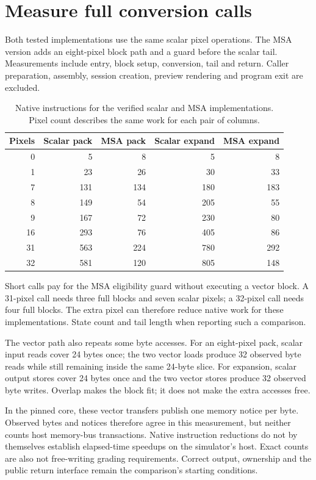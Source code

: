 \section{Measure full conversion calls}\label{rgb-measurement}
Both tested implementations use the same scalar pixel operations. The MSA version
adds an eight-pixel block path and a guard before the scalar tail. Measurements
include entry, block setup, conversion, tail and return. Caller preparation,
assembly, session creation, preview rendering and program exit are excluded.

\begin{table}[htbp]
  \centering
  \caption{Native instructions for the verified scalar and MSA implementations. Pixel count describes the same work for each pair of columns.}
  \begin{tabular}{rrrrr}
    \toprule
    Pixels & Scalar pack & MSA pack & Scalar expand & MSA expand \\
    \midrule
    0      & 5           & 8        & 5             & 8          \\
    1      & 23          & 26       & 30            & 33         \\
    7      & 131         & 134      & 180           & 183        \\
    8      & 149         & 54       & 205           & 55         \\
    9      & 167         & 72       & 230           & 80         \\
    16     & 293         & 76       & 405           & 86         \\
    31     & 563         & 224      & 780           & 292        \\
    32     & 581         & 120      & 805           & 148        \\
    \bottomrule
  \end{tabular}
\end{table}

Short calls pay for the MSA eligibility guard without executing a vector block.
A 31-pixel call needs three full blocks and seven scalar pixels; a 32-pixel call
needs four full blocks. The extra pixel can therefore reduce native work for these
implementations. State count and tail length when reporting such a comparison.

The vector path also repeats some byte accesses. For an eight-pixel pack, scalar
input reads cover 24 bytes once; the two vector loads produce 32 observed byte
reads while still remaining inside the same 24-byte slice. For expansion, scalar
output stores cover 24 bytes once and the two vector stores produce 32 observed
byte writes. Overlap makes the block fit; it does not make the extra accesses free.

In the pinned core, these vector transfers publish one memory notice per byte.
Observed bytes and notices therefore agree in this measurement, but neither counts
host memory-bus transactions. Native instruction reductions do not by themselves
establish elapsed-time speedups on the simulator's host. Exact counts are also not
free-writing grading requirements. Correct output, ownership and the public return
interface remain the comparison's starting conditions.
